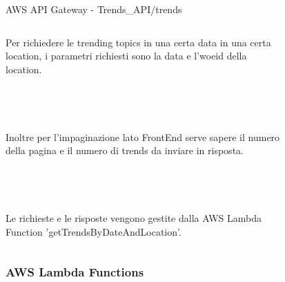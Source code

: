 \documentclass[xcolor=svgnames, aspectratio=169]{beamer}
\begin{document}
\begin{frame}{AWS API Gateway - Trends\_API/trends}
    \fontsize{8pt}{8}\selectfont
    \begin{columns}[t]
        Per richiedere le trending topics in una certa data in una certa location, i parametri richiesti sono la data e l'woeid della location.\\~\\~\\~\\~\\
        
        Inoltre per l'impaginazione lato FrontEnd serve sapere il numero della pagina e il numero di trends da inviare in risposta.\\~\\~\\~\\~\\
        
        Le richieste e le risposte vengono gestite dalla AWS Lambda Function 'getTrendsByDateAndLocation'.
        \vspace*{-8pt}
        \begin{figure}[H]
            \centering
            \noindent{}
        \end{figure}
    \end{columns}
\end{frame}


\subsubsection{AWS Lambda Functions}
\end{document}
